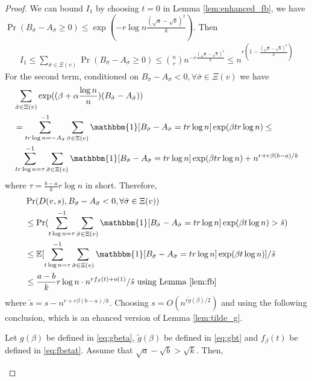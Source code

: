 \documentclass{article}
\begin{document}
\begin{proof}
We can bound $I_1$ by choosing $t=0$ in Lemma \ref{lem:enhanced_fb}, we have
$\Pr( B_{\bar{\sigma}} - A_{\bar{\sigma}} \ge 0 ) \leq \exp(-r\log n \frac{(\sqrt{a}-\sqrt{b})^2}{k})$.
Then
\begin{align*}
I_1 \leq \sum_{\bar{\sigma} \in \Xi(v)} \Pr( B_{\bar{\sigma}} - A_{\bar{\sigma}} \geq 0) \leq \binom{n}{r} n^{-r\frac{(\sqrt{a}-\sqrt{b})^2}{k}}
\leq n^{r(1-\frac{(\sqrt{a}-\sqrt{b})^2}{k})}
\end{align*}
For the second term,
conditioned on $B_{\bar{\sigma}} - A_{\bar{\sigma}}    < 0, \forall \bar{\sigma} \in \Xi(v)$ we have
\begin{align*}
&\sum_{\bar{\sigma} \in \Xi(v)} \exp ( (\beta + \alpha \frac{\log n}{n})(B_{\bar{\sigma}} - A_{\bar{\sigma}} ) ) \\
& = \sum_{tr\log n = -A_{\bar{\sigma}} }^{-1} \sum_{\bar{\sigma} \in \Xi(v)} \mathbbm{1}[B_{\bar{\sigma}} - A_{\bar{\sigma}}  = tr \log n] \exp ( \beta  tr\log n)\leq \\ 
&
\sum_{tr\log n =\tau}^{-1} \sum_{\bar{\sigma} \in \Xi(v)}  \mathbbm{1}[B_{\bar{\sigma}} - A_{\bar{\sigma}}  = tr \log n]
\exp ( \beta  tr\log n) + n^{r+r\beta(b-a)/k}
\end{align*}
where $\tau =\frac{b-a}{k}r\log n$ in short. Therefore,
\begin{align*}
&\Pr(D(v,s), B_{\bar{\sigma}} - A_{\bar{\sigma}}  < 0, \forall \bar{\sigma} \in \Xi(v))  \\
&\leq\Pr(\sum_{t\log n =\tau}^{-1}\sum_{\bar{\sigma} \in \Xi(v)} \mathbbm{1}[B_{\bar{\sigma}} - A_{\bar{\sigma}} = tr\log n]\exp ( \beta  t\log n)  > \tilde{s} ) \\
& \leq \mathbb{E}[\sum_{t\log n =\tau}^{-1}\sum_{\bar{\sigma} \in \Xi(v)} \mathbbm{1}[B_{\bar{\sigma}} - A_{\bar{\sigma}} = tr\log n]\exp ( \beta  t\log n)] /  \tilde{s} \\
& \leq \frac{a-b}{k}r\log n \cdot n^{rf_{\beta}(t) + o(1)} / \tilde{s} \textrm{ using Lemma \ref{lem:fb} }
\end{align*}
where $\tilde{s} = s - n^{r+r\beta(b-a)/k}$. 
Choosing $s = O(n^{r\tilde{g}(\beta)/2})$ and using the following conclusion, which is an ehanced version of Lemma
\ref{lem:tilde_g}.
\begin{lemma} \label{lm:ele}
Let $g(\beta)$ be defined in \eqref{eq:gbeta}, $\tilde{g}(\beta)$ be defined in \eqref{eq:gbt} and $f_{\beta}(t)$ be defined in \eqref{eq:fbetat}. Assume that $\sqrt{a}-\sqrt{b}>\sqrt{k}$.
Then,


\end{lemma}
\end{proof}
\end{document}
